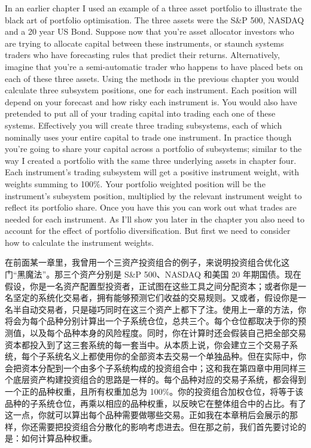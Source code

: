 \begin{englishblock} In an earlier chapter I used an example of a three asset portfolio to illustrate the black art of portfolio optimisation. The three assets were the S\&P 500, NASDAQ and a 20 year US Bond. Suppose now that you're asset allocator investors who are trying to allocate capital between these instruments, or staunch systems traders who have forecasting rules that predict their returns. Alternatively, imagine that you're a semi-automatic trader who happens to have placed bets on each of these three assets. Using the methods in the previous chapter you would calculate three subsystem positions, one for each instrument. Each position will depend on your forecast and how risky each instrument is. You would also have pretended to put all of your trading capital into trading each one of these systems. Effectively you will create three trading subsystems, each of which nominally uses your entire capital to trade one instrument. In practice though you're going to share your capital across a portfolio of subsystems; similar to the way I created a portfolio with the same three underlying assets in chapter four. Each instrument's trading subsystem will get a positive instrument weight, with weights summing to 100\%. Your portfolio weighted position will be the instrument's subsystem position, multiplied by the relevant instrument weight to reflect its portfolio share. Once you have this you can work out what trades are needed for each instrument. As I'll show you later in the chapter you also need to account for the effect of portfolio diversification. But first we need to consider how to calculate the instrument weights. \end{englishblock}

\begin{chineseblock}在前面某一章里，我曾用一个三资产投资组合的例子，来说明投资组合优化这门“黑魔法”。那三个资产分别是 S\&P 500、NASDAQ 和美国 20 年期国债。现在假设，你是一名资产配置型投资者，正试图在这些工具之间分配资本；或者你是一名坚定的系统化交易者，拥有能够预测它们收益的交易规则。又或者，假设你是一名半自动交易者，只是碰巧同时在这三个资产上都下了注。使用上一章的方法，你将会为每个品种分别计算出一个子系统仓位，总共三个。每个仓位都取决于你的预测值，以及每个品种本身的风险程度。同时，你在计算时还会假装自己把全部交易资本都投入到了这三套系统的每一套当中。从本质上说，你会建立三个交易子系统，每个子系统名义上都使用你的全部资本去交易一个单独品种。但在实际中，你会把资本分配到一个由多个子系统构成的投资组合中；这和我在第四章中用同样三个底层资产构建投资组合的思路是一样的。每个品种对应的交易子系统，都会得到一个正的品种权重，且所有权重加总为 100\%。你的投资组合加权仓位，将等于该品种的子系统仓位，再乘以相应的品种权重，以反映它在整体组合中的占比。有了这一点，你就可以算出每个品种需要做哪些交易。正如我在本章稍后会展示的那样，你还需要把投资组合分散化的影响考虑进去。但在那之前，我们首先要讨论的是：如何计算品种权重。\end{chineseblock}

